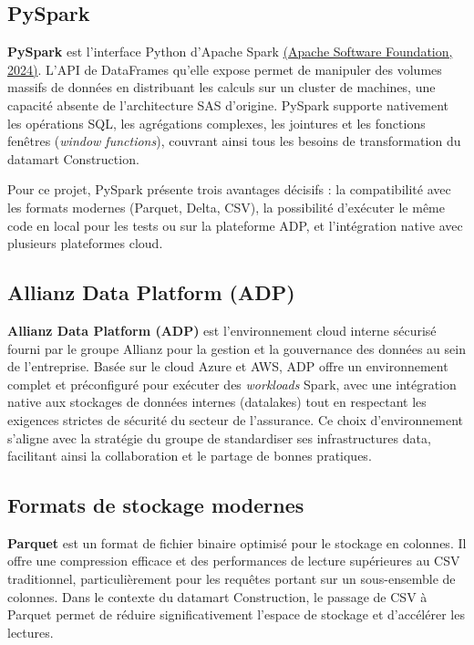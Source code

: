 \subsection{PySpark}

\textbf{PySpark} est l'interface Python d'Apache Spark \hyperlink{ref.apache}{(Apache Software Foundation, 2024)}. L'API de DataFrames qu'elle expose permet de manipuler des volumes massifs de données en distribuant les calculs sur un cluster de machines, une capacité absente de l'architecture SAS d'origine. PySpark supporte nativement les opérations SQL, les agrégations complexes, les jointures et les fonctions fenêtres (\textit{window functions}), couvrant ainsi tous les besoins de transformation du datamart Construction.

Pour ce projet, PySpark présente trois avantages décisifs : la compatibilité avec les formats modernes (Parquet, Delta, CSV), la possibilité d'exécuter le même code en local pour les tests ou sur la plateforme ADP, et l'intégration native avec plusieurs plateformes cloud.

\subsection{Allianz Data Platform (ADP)}

\textbf{Allianz Data Platform (ADP)} est l'environnement cloud interne sécurisé fourni par le groupe Allianz pour la gestion et la gouvernance des données au sein de l'entreprise. Basée sur le cloud Azure et AWS, ADP offre un environnement complet et préconfiguré pour exécuter des \textit{workloads} Spark, avec une intégration native aux stockages de données internes (datalakes) tout en respectant les exigences strictes de sécurité du secteur de l'assurance. Ce choix d'environnement s'aligne avec la stratégie du groupe de standardiser ses infrastructures data, facilitant ainsi la collaboration et le partage de bonnes pratiques.

\subsection{Formats de stockage modernes}

\textbf{Parquet} est un format de fichier binaire optimisé pour le stockage en colonnes. Il offre une compression efficace et des performances de lecture supérieures au CSV traditionnel, particulièrement pour les requêtes portant sur un sous-ensemble de colonnes. Dans le contexte du datamart Construction, le passage de CSV à Parquet permet de réduire significativement l'espace de stockage et d'accélérer les lectures.

